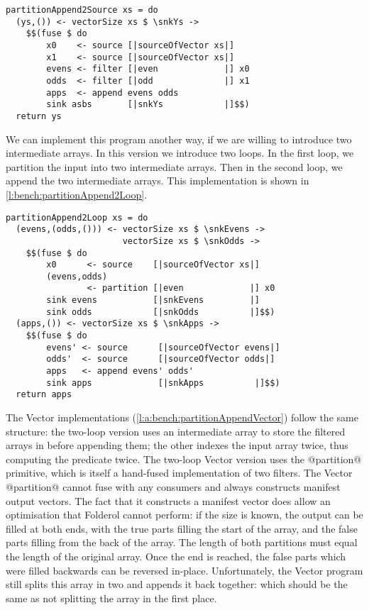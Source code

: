 \begin{lstlisting}[float,label=l:bench:partitionAppend2Source,caption=Partition / append with two sources]
partitionAppend2Source xs = do
  (ys,()) <- vectorSize xs $ \snkYs ->
    $$(fuse $ do
        x0    <- source [|sourceOfVector xs|]
        x1    <- source [|sourceOfVector xs|]
        evens <- filter [|even             |] x0
        odds  <- filter [|odd              |] x1
        apps  <- append evens odds
        sink asbs       [|snkYs            |]$$)
  return ys
\end{lstlisting}

We can implement this program another way, if we are willing to introduce two intermediate arrays.
In this version we introduce two loops.
In the first loop, we partition the input into two intermediate arrays.
Then in the second loop, we append the two intermediate arrays.
This implementation is shown in \cref{l:bench:partitionAppend2Loop}.

\begin{lstlisting}[float,label=l:bench:partitionAppend2Loop,caption=Partition / append with two loops]
partitionAppend2Loop xs = do
  (evens,(odds,())) <- vectorSize xs $ \snkEvens ->
                       vectorSize xs $ \snkOdds ->
    $$(fuse $ do
        x0      <- source    [|sourceOfVector xs|]
        (evens,odds)
                <- partition [|even             |] x0
        sink evens           [|snkEvens         |]
        sink odds            [|snkOdds          |]$$)
  (apps,()) <- vectorSize xs $ \snkApps ->
    $$(fuse $ do
        evens' <- source      [|sourceOfVector evens|]
        odds'  <- source      [|sourceOfVector odds|]
        apps   <- append evens' odds'
        sink apps             [|snkApps          |]$$)
  return apps
\end{lstlisting}

The Vector implementations (\cref{l:a:bench:partitionAppendVector}) follow the same structure: the two-loop version uses an intermediate array to store the filtered arrays in before appending them; the other indexes the input array twice, thus computing the predicate twice.
The two-loop Vector version uses the @partition@ primitive, which is itself a hand-fused implementation of two filters.
The Vector @partition@ cannot fuse with any consumers and always constructs manifest output vectors.
The fact that it constructs a manifest vector does allow an optimisation that Folderol cannot perform: if the size is known, the output can be filled at both ends, with the true parts filling the start of the array, and the false parts filling from the back of the array.
The length of both partitions must equal the length of the original array.
Once the end is reached, the false parts which were filled backwards can be reversed in-place.
Unfortunately, the Vector program still splits this array in two and appends it back together: which should be the same as not splitting the array in the first place.

